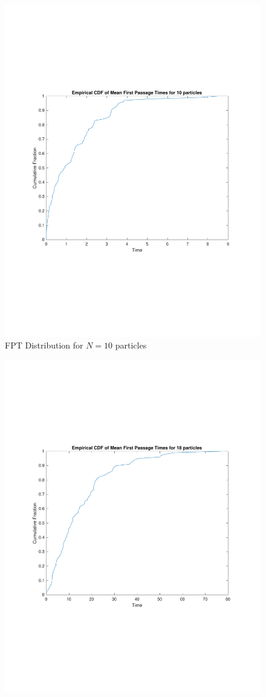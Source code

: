 \documentclass{article}
\begin{document}
\begin{figure}[]
\includegraphics[scale=0.5]{ECDF10.pdf}
\caption{FPT Distribution for $N=10$ particles}
\label{fig:CDF10}
\end{figure}\begin{figure}[]
\centering
\includegraphics[scale=0.5]{ECDF18.pdf}

\end{figure}
\end{document}
